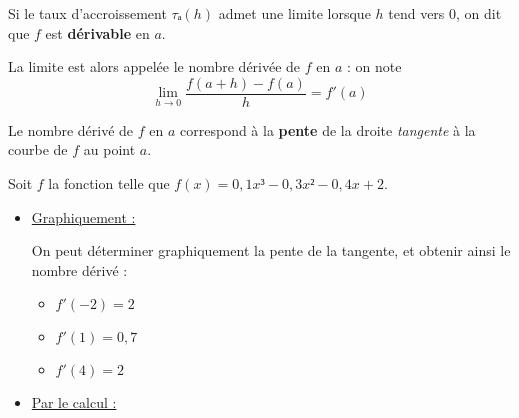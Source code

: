 \documentclass[
	classe=$1^{ere}STI2D$,
	headerTitle=Cours\space Chapitre\space 5
]{coursclass}
\begin{document}
\begin{definition}
	Si le taux d'accroissement $τₐ(h)$ admet une limite lorsque $h$ tend vers $0$, on dit que $f$ est \textbf{dérivable} en $a$.

	La limite est alors appelée le nombre dérivée de $f$ en $a$ : on note
	$$ \lim_{h→0} \dfrac{f(a+h)-f(a)}{h} = f'(a) $$
\end{definition}

\begin{remarque}
	Le nombre dérivé de $f$ en $a$ correspond à la \textbf{pente} de la droite \textit{tangente} à la courbe de $f$ au point $a$.
\end{remarque}

\begin{exemple}
	Soit $f$ la fonction telle que $f(x) = 0,1x³ - 0,3x² - 0,4x + 2$.

	\begin{itemize}
		\item \uline{Graphiquement :}

		      \begin{center}
			      \newcommand{\funcFCoefficientA}{0.1}
			      \newcommand{\funcFCoefficientB}{-0.3}
			      \newcommand{\funcFCoefficientC}{-0.4}
			      \newcommand{\funcFCoefficientD}{2.0}
			      \newcommand{\funcF}[1]{(\funcFCoefficientA)*#1*#1*#1 + (\funcFCoefficientB)*#1*#1 + (\funcFCoefficientC)*#1 + (\funcFCoefficientD)}
			      \newcommand{\funcPrimeF}[1]{3*(\funcFCoefficientA)*#1*#1 + 2*(\funcFCoefficientB)*#1 + (\funcFCoefficientC)}
			      \newcommand{\tangenteEnA}[2]{(\funcPrimeF{#1})*#2 + (\funcF{#1}) - #1*(\funcPrimeF{#1})}
		      \end{center}

		      On peut déterminer graphiquement la pente de la tangente, et obtenir ainsi le nombre dérivé :
		      \begin{multicols}{3}
			      \begin{itemize}
				      \item $f'(-2) = 2$
				      \item $f'(1) = 0,7$
				      \item $f'(4) = 2$
			      \end{itemize}
		      \end{multicols}
		\item \uline{Par le calcul :}


\end{itemize}
\end{exemple}
\end{document}
